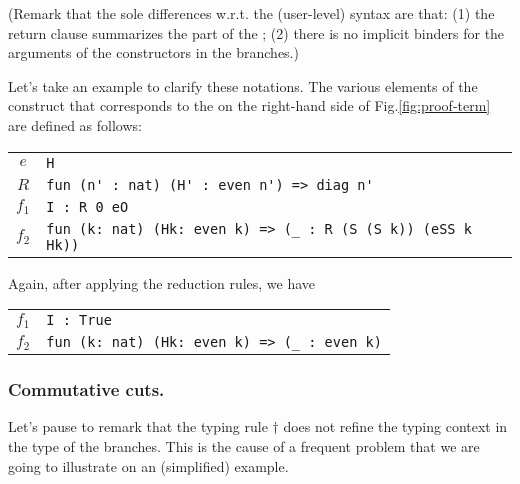 \documentclass{llncs}
\begin{document}
(Remark that the sole differences w.r.t. the (user-level) 
syntax are that:
%
(1) the return clause summarizes the 
part of the ;
%
(2) there is no implicit binders for the arguments of the constructors
in the branches.)

\newcommand\figref[1]{Fig.\ref{#1}}

Let's take an example to clarify these notations. The various elements
of the  construct that corresponds to the  on
the right-hand side of \figref{fig:proof-term} are defined as follows:
\begin{center}
  \begin{tabular}{c@{$\quad\eqdef\quad$}l}
    $e$ & \lstinline[language=Coq, basicstyle=\normalsize]|H| \\
    $R$ & \lstinline[language=Coq, basicstyle=\normalsize]|fun (n' : nat) (H' : even n') => diag n'| \\
    $f_1$ & \lstinline[language=Coq, basicstyle=\normalsize]|I : R 0 eO| \\
    $f_2$ & \lstinline[language=Coq, basicstyle=\normalsize]|fun (k: nat) (Hk: even k) => (_ : R (S (S k)) (eSS k Hk))|
  \end{tabular}
\end{center}
Again, after applying the reduction rules, we have 
\begin{center}
  \begin{tabular}{c@{$\quad\equiv\quad$}l}
    $f_1$ & \lstinline[language=Coq, basicstyle=\normalsize]|I : True| \\
    $f_2$ & \lstinline[language=Coq, basicstyle=\normalsize]|fun (k: nat) (Hk: even k) => (_ : even k)|
  \end{tabular}
\end{center}

\subsubsection{Commutative cuts.}
Let's pause to remark that the typing rule $\dagger$ does not refine
the typing context in the type of the branches. This is the cause of a
frequent problem that we are going to illustrate on an (simplified)
example.
\end{document}
